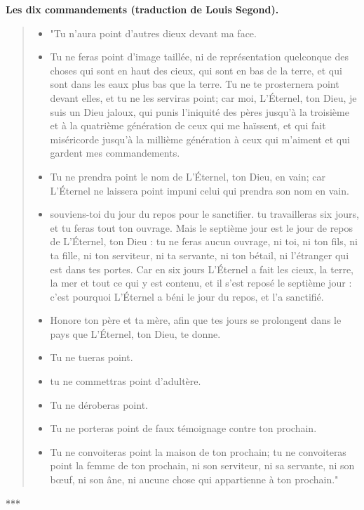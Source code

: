 \vfill
\newpage
\textbf{Les dix commandements (traduction de Louis Segond).}
\begin{quote}
\begin{itemize}
\item "Tu n’aura point d’autres dieux devant ma face.
\item Tu ne feras point d’image taillée, ni de représentation quelconque des choses qui sont en haut des cieux, qui sont en bas de la terre, et qui sont dans les eaux plus bas que la terre. Tu ne te prosternera point devant elles, et tu ne les serviras point; car moi, L’Éternel, ton Dieu, je suis un Dieu jaloux, qui punis l’iniquité des pères jusqu’à la troisième et à la quatrième génération de ceux qui me haïssent, et qui fait miséricorde jusqu’à la millième génération à ceux qui
m’aiment et qui gardent mes commandements. 
\item Tu ne prendra point le nom de L’Éternel, ton Dieu, en vain; car L’Éternel ne laissera point impuni celui qui prendra son nom en vain.
\item souviens-toi du jour du repos pour le sanctifier. tu travailleras six jours, et tu feras tout ton ouvrage. Mais le septième jour est le jour de repos de L’Éternel, ton Dieu : tu ne feras aucun ouvrage, ni toi, ni ton fils, ni ta fille, ni ton serviteur, ni ta servante, ni ton bétail, ni l’étranger qui est dans tes portes. Car en six jours L’Éternel a fait les cieux, la terre, la mer et tout ce qui y est contenu, et il s’est reposé le septième jour : c’est pourquoi L’Éternel a béni le jour du repos, et l’a sanctifié.
\item Honore ton père et ta mère, afin que tes jours se prolongent dans le pays que L’Éternel, ton Dieu, te donne.
\item Tu ne tueras point.
\item tu ne commettras point d’adultère.
\item Tu ne déroberas point.
\item Tu ne porteras point de faux témoignage contre ton prochain.
\item Tu ne convoiteras point la maison de ton prochain; tu ne convoiteras point la femme de ton prochain, ni son serviteur, ni sa servante, ni son bœuf, ni son âne, ni aucune chose qui appartienne à ton prochain."
\end{itemize}
\end{quote}

\begin{center}
***
\end{center}


